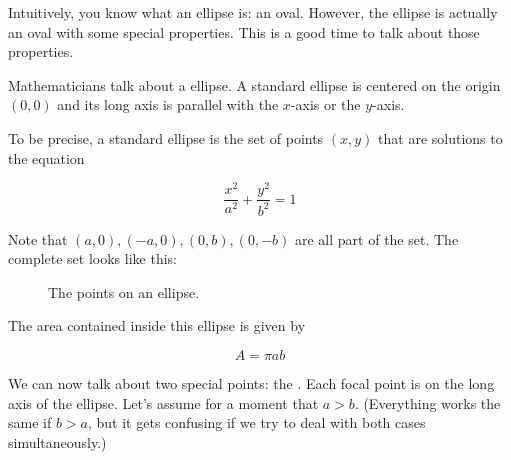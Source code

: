 Intuitively, you know what an ellipse is: an oval. However, the
ellipse is actually an oval with some special properties. This is a
good time to talk about those properties.

Mathematicians talk about a  ellipse. A standard ellipse is
centered on the origin $(0,0)$ and its long axis is parallel with the
$x$-axis or the $y$-axis.

\begin{mdframed}[style=important, frametitle={Equation for a Standard Ellipse}]

To be precise, a standard ellipse is the set of points $(x, y)$ that
are solutions to the equation

$$\frac{x^2}{a^2} + \frac{y^2}{b^2} = 1$$


Note that $(a,0), (-a, 0), (0, b), (0,-b)$ are all part of the
set. The complete set looks like this:

\begin{figure}[htbp]
    \centering
    \caption{The points on an ellipse.}
    \label{fig:ellipsePoints}
\end{figure}

The area contained inside this ellipse is given by

$$A = \pi a b$$


\end{mdframed}


We can now talk about two special points: the . Each
focal point is on the long axis of the ellipse. Let's assume for a
moment that $a > b$. (Everything works the same if $b > a$, but it
gets confusing if we try to deal with both cases simultaneously.)

